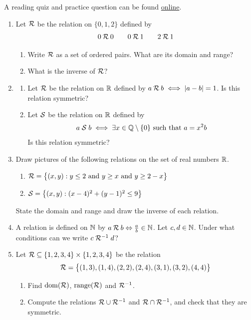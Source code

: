 \begin{exercises}{}{}
	A reading quiz and practice question can be found \href{http://www.math.uci.edu/~ndonalds/math13/selftest/7-1-relations.html}{online}.
	
\begin{enumerate}
  \item Let $\mathcal{R}$ be the relation on $\{0,1,2\}$ defined by
  \[
  	0\mathbin{\mathcal{R}} 0\qquad 0\mathbin{\mathcal{R}} 1\qquad 2\mathbin{\mathcal{R}} 1\]
  \begin{enumerate}
    \item Write $\mathcal{R}$ as a set of ordered pairs. What are its domain and range?
    \item What is the inverse of $\mathcal{R}$?
	\end{enumerate}
	
	\item\begin{enumerate}
	  \item Let $\mathcal{R}$ be the relation on $\mathbb{R}$ defined by $a\mathbin{\mathcal{R}} b\iff\left| a-b\right|=1$. Is this relation symmetric? 
 		\item Let $\mathcal{S}$ be the relation on $\mathbb{R}$ defined by 
		\[
			a \mathrel{\mathcal{S}} b \iff \exists x \in \mathbb{Q}\setminus\{0\} \text{ such that } a=x^2b
		\]
		Is this relation symmetric? 
	\end{enumerate}
	
  
	\item Draw pictures of the following relations on the set of real numbers $\mathbb{R}$.
	\begin{enumerate}
		\item $\mathcal{R}=\bigl\{(x,y):y\le 2\text{ and }y\ge x\text{ and }y\ge 2-x\bigr\}$
		\item $\mathcal{S}=\bigl\{(x,y):(x-4)^2+(y-1)^2\le 9\bigr\}$
	\end{enumerate}
	State the domain and range and draw the inverse of each relation.
	
	
	\item A relation is defined on $\mathbb{N}$ by $a\mathbin{\mathcal{R}} b \Leftrightarrow \frac ab\in\mathbb{N}$. Let $c,d\in\mathbb{N}$. Under what conditions can we write $c\mathrel{\mathcal{R}^{-1}} d$?
	
	
	\item Let $\mathcal{R}\subseteq\{1,2,3,4\}\times\{1,2,3,4\}$ be the relation
	\[
		\mathcal{R}=\bigl\{(1,3),(1,4),(2,2),(2,4),(3,1),(3,2),(4,4)\bigr\}
	\]
	\begin{enumerate}
	  \item Find $\operatorname{dom}(\mathcal{R})$, $\operatorname{range}(\mathcal{R})$ and $\mathcal{R}^{-1}$.
	  \item Compute the relations $\mathcal{R}\cup\mathcal{R}^{-1}$ and $\mathcal{R}\cap\mathcal{R}^{-1}$, and check that they are symmetric.
	\end{enumerate}
	

\end{enumerate}
\end{exercises}
